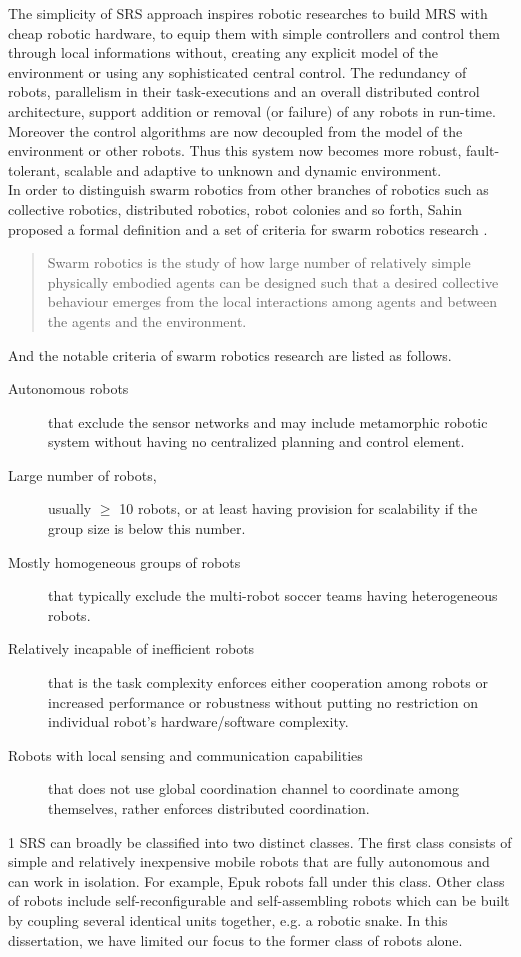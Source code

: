  The simplicity of SRS approach inspires robotic researches to build MRS with cheap robotic hardware, to equip them with simple controllers and control them through local informations without, creating any explicit model of the environment or using any sophisticated central control. The redundancy of robots, parallelism in their task-executions and an overall distributed control architecture,  support addition or removal (or failure) of any robots in run-time. Moreover the control algorithms are now decoupled from the model of the environment or other robots. Thus this system now becomes more robust, fault-tolerant, scalable and adaptive to unknown and dynamic environment.\\
In order to distinguish swarm robotics from other branches of robotics such as collective robotics, distributed robotics, robot colonies and so forth, Sahin proposed a formal definition and a set of criteria for swarm robotics research \cite{Sahin+2005}.  
\begin{quotation}
Swarm robotics is the study of how large number of relatively simple physically embodied agents can be designed such that a desired collective behaviour emerges from the local interactions among agents and between the agents and the environment. 
\end{quotation}
And the notable criteria of swarm robotics research are listed as follows.
\begin{description}
\item[Autonomous robots]
that exclude the sensor networks and may include metamorphic robotic system without having no centralized planning and control element.
\item[Large number of robots,]
usually $\geq$ 10 robots, or at least having provision for scalability if the group size is below this number.
\item[Mostly homogeneous groups of robots]
that typically exclude the multi-robot soccer teams having heterogeneous robots.
\item[Relatively incapable of inefficient robots]
that is the task complexity enforces either cooperation among robots or increased performance or robustness without putting no restriction on individual robot's hardware/software complexity.
\item[Robots with local sensing and communication capabilities]
that does not use global coordination channel to coordinate among themselves, rather enforces distributed coordination.
\end{description}1
SRS can broadly be classified into two distinct classes. The first class consists of simple and relatively inexpensive mobile robots that are fully autonomous and can work in isolation. For example, Epuk robots \cite{Cianci+2004} fall under this class.  Other class of robots include self-reconfigurable \cite{Fukuda+1987} and self-assembling robots which can be built by coupling several identical units together, e.g. a robotic snake. In this dissertation, we have limited our focus to the former class of robots alone.\\
